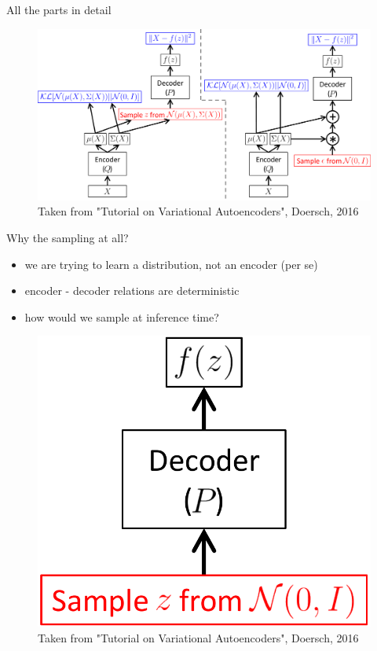 \documentclass[10pt]{beamer}
\begin{document}
\begin{frame}{All the parts in detail}
	\begin{center}
            \begin{figure}
                \includegraphics[width=\textwidth]{figs/net.pdf}
                \caption{Taken from "Tutorial on Variational Autoencoders", Doersch, 2016}
            \end{figure}
	\end{center}
\end{frame}

\begin{frame}{Why the sampling at all?}
    \begin{itemize}[<+->]
        \item we are trying to learn a distribution, not an encoder (per se)
        \item encoder - decoder relations are deterministic
        \item how would we sample at inference time?
    \end{itemize}
    \pause
    \begin{center}
        \begin{figure}
            \includegraphics[height=0.4\textheight]{figs/test_time.pdf}
                \caption{Taken from "Tutorial on Variational Autoencoders", Doersch, 2016}
        \end{figure}
    \end{center}
\end{frame}
\end{document}
